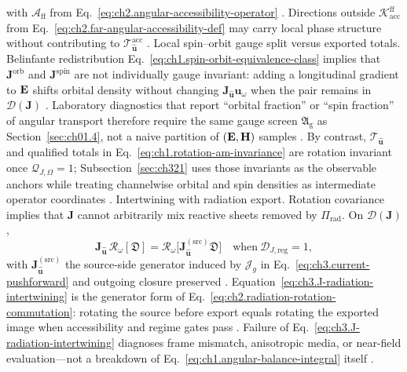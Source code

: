 with \(\mathcal{A}_{\mathrm{ff}}\) from Eq.~\eqref{eq:ch2.angular-accessibility-operator}
\cite{stratton1941}. Directions outside
\(\mathcal{K}_{\mathrm{acc}}^{\mathrm{ff}}\) from Eq.~\eqref{eq:ch2.far-angular-accessibility-def} may carry
local phase structure without contributing to \(\mathcal{T}_{\hat{\mathbf{u}}}^{\mathrm{acc}}\)
\cite{harrington2001}.
Local spin--orbit gauge split versus exported totals. Belinfante redistribution Eq.~\eqref{eq:ch1.spin-orbit-equivalence-class} implies that
\(\mathbf{J}^{\mathrm{orb}}\) and \(\mathbf{J}^{\mathrm{spin}}\) are not individually gauge invariant:
adding a longitudinal gradient to \(\mathbf{E}\) shifts orbital density without changing
\(\mathbf{J}_{\hat{\mathbf{u}}}\mathbf{u}_\omega\) when the pair remains in \(\mathcal{D}(\mathbf{J})\)
\cite{belinfante1940}. Laboratory diagnostics that report ``orbital fraction'' or ``spin
fraction'' of angular transport therefore require the same gauge screen \(\mathfrak{A}_{\mathrm{g}}\) as
Section~\ref{sec:ch01.4}, not a naive partition of \((\mathbf{E},\mathbf{H})\) samples \cite{belinfante1940}. By contrast,
\(\mathcal{T}_{\hat{\mathbf{u}}}\) and qualified totals in Eq.~\eqref{eq:ch1.rotation-am-invariance} are
rotation invariant once \(\mathcal{Q}_{J,\Omega}=1\); Subsection~\ref{sec:ch321} uses those invariants as the
observable anchors while treating channelwise orbital and spin densities as intermediate operator coordinates
\cite{stratton1941}.
Intertwining with radiation export. Rotation covariance implies that \(\mathbf{J}\) cannot arbitrarily mix reactive sheets removed by
\(\Pi_{\mathrm{rad}}\). On \(\mathcal{D}(\mathbf{J})\),
\begin{equation}
\label{eq:ch3.J-radiation-intertwining}
\mathbf{J}_{\hat{\mathbf{u}}}\,\mathcal{R}_\omega[\mathfrak{D}]
=
\mathcal{R}_\omega\big[\mathbf{J}_{\hat{\mathbf{u}}}^{(\mathrm{src})}\mathfrak{D}\big]
\quad\text{when}\ 
\mathcal{D}_{J,\mathrm{reg}}=1,
\end{equation}
with \(\mathbf{J}_{\hat{\mathbf{u}}}^{(\mathrm{src})}\) the source-side generator induced by
\(\mathcal{J}_g\) in Eq.~\eqref{eq:ch3.current-pushforward} and outgoing closure preserved
\cite{stratton1941}. Equation~\eqref{eq:ch3.J-radiation-intertwining} is the
generator form of Eq.~\eqref{eq:ch2.radiation-rotation-commutation}: rotating the source before export equals
rotating the exported image when accessibility and regime gates pass \cite{stratton1941}. Failure of
Eq.~\eqref{eq:ch3.J-radiation-intertwining} diagnoses frame mismatch, anisotropic media, or near-field
evaluation---not a breakdown of Eq.~\eqref{eq:ch1.angular-balance-integral} itself \cite{harrington2001}.
